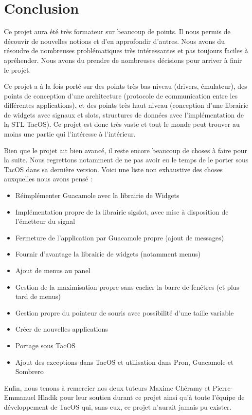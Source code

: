 \section{Conclusion}

Ce projet aura été très formateur sur beaucoup de points.
Il nous permis de découvir de nouvelles notions et d'en approfondir d'autres.
Nous avons du résoudre de nombreuses problématiques très intéressantes et pas toujours faciles à apréhender.
Nous avons du prendre de nombreuses décisions pour arriver à finir le projet.

Ce projet a à la fois porté sur des points très bas niveau (drivers, émulateur), des points de conception d'une architecture (protocole de communication entre les différentes applications), et des points très haut niveau (conception d'une librairie de widgets avec signaux et slots, structures de données avec l'implémentation de la STL TacOS).
Ce projet est donc très vaste et tout le monde peut trouver au moins une partie qui l'intéresse à l'intérieur.

Bien que le projet ait bien avancé, il reste encore beaucoup de choses à faire pour la suite.
Nous regrettons notamment de ne pas avoir eu le temps de le porter sous TacOS dans sa dernière version.
Voici une liste non exhaustive des choses auxquelles nous avons pensé :

\begin{itemize}
  \item Réimplémenter Guacamole avec la librairie de Widgets
  \item Implémentation propre de la librairie sigslot, avec mise à disposition de l'émetteur du signal
  \item Fermeture de l'application par Guacamole propre (ajout de messages)
  \item Fournir d'avantage la librairie de widgets (notamment menus)
  \item Ajout de menus au panel
  \item Gestion de la maximisation propre sans cacher la barre de fenêtres (et plus tard de menus)
  \item Gestion propre du pointeur de souris avec possibilité d'une taille variable
  \item Créer de nouvelles applications
  \item Portage sous TacOS
  \item Ajout des exceptions dans TacOS et utilisation dans Pron, Guacamole et Sombrero
\end{itemize}

Enfin, nous tenons à remercier nos deux tuteurs Maxime Chéramy et Pierre-Emmanuel Hladik pour leur soutien durant ce projet ainsi qu'à toute l'équipe de développement de TacOS qui, sans eux, ce projet n'aurait jamais pu exister.
